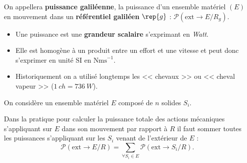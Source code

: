\begin{remarque}%
On appellera \textbf{puissance galiléenne}, la puissance d'un ensemble matériel $(E)$ en mouvement dans un \textbf{référentiel galiléen} $\rep{g}$ : 
$
\mathcal{P}(\text{ext} \rightarrow E/R_g)
$.
\end{remarque}%


\begin{marginfigure}[-5cm]
\begin{itemize}
\item Une puissance est une \textbf{grandeur scalaire} s'exprimant en \textit{Watt}.
\item Elle est homogène à un produit entre un effort et une vitesse et peut donc s'exprimer en unité SI en $\text{Nms}^{-1}$.
\item Historiquement on a utilisé longtemps les << chevaux >> ou << cheval vapeur >> ($\SI{1}{ch}= \SI{736}{W}$).
\end{itemize}
\end{marginfigure}

\begin{prop}
On considère un ensemble matériel $E$ composé de $n$ solides $S_i$. 

Dans la pratique pour calculer la puissance totale des actions mécaniques s'appliquant sur $E$ dans son mouvement par rapport à $R$ il faut sommer toutes les puissances s'appliquant sur les $S_i$ venant de l'extérieur de $E$ :
$$
\mathcal{P}(\text{ext} \rightarrow E/R)=\displaystyle{\sum_{\forall S_i \in E}\mathcal{P}(\text{ext} \rightarrow S_i/R)}.
$$
\end{prop}

%
%
%

